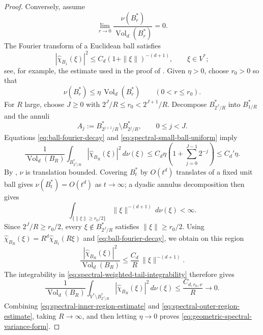 \documentclass[11pt,reqno,a4paper]{amsart}
\numberwithin{equation}{section}
\theoremstyle{compact}
\theoremstyle{definition}
\theoremstyle{definition}
\newcommand{\Vol}{\operatorname{Vol}}
\begin{document}
\begin{proof}
Conversely, assume
\begin{equation}\label{eq:spectral-smallness-fixed-coefficient}
  \lim_{r\to0}\frac{\nu(B_r^*)}{\Vol_d(B_r^*)}=0.
\end{equation}
The Fourier transform of a Euclidean ball satisfies
\begin{equation}\label{eq:ball-fourier-decay}
  |\widehat\chi_{B_1}(\xi)|^2
  \leq C_d(1+\|\xi\|)^{-(d+1)},
  \qquad \xi\in V^*;
\end{equation}
see, for example, the estimate used in the proof of
\cite[Theorem~3.6(iii)]{BH24}.  Given $\eta>0$, choose $r_0>0$ so that
\begin{equation}\label{eq:spectral-small-ball-uniform}
  \nu(B_r^*)\leq \eta\,\Vol_d(B_r^*)
  \qquad(0<r\leq r_0).
\end{equation}
For $R$ large, choose $J\geq0$ with
$2^J/R\leq r_0<2^{J+1}/R$.  Decompose $B_{2^J/R}^*$ into $B_{1/R}^*$ and
the annuli
\begin{equation}\label{eq:spectral-dyadic-annuli}
  A_j:=B_{2^{j+1}/R}^*\setminus B_{2^j/R}^*,
  \qquad 0\leq j<J.
\end{equation}
Equations \eqref{eq:ball-fourier-decay} and
\eqref{eq:spectral-small-ball-uniform} imply
\begin{equation}\label{eq:spectral-inner-region-estimate}
  \frac{1}{\Vol_d(B_R)}
  \int_{B_{2^J/R}^*}|\widehat\chi_{B_R}(\xi)|^2\,d\nu(\xi)
  \leq C_d\eta\left(1+\sum_{j=0}^{J-1}2^{-j}\right)
  \leq C_d'\eta.
\end{equation}
By , $\nu$ is translation bounded.
Covering $B_t^*$ by $O(t^d)$ translates of a fixed unit ball gives
$\nu(B_t^*)=O(t^d)$ as $t\to\infty$; a dyadic annulus decomposition then
gives
\begin{equation}\label{eq:spectral-weighted-tail-integrability}
  \int_{\{\|\xi\|\geq r_0/2\}}
       \|\xi\|^{-(d+1)}\,d\nu(\xi)<\infty.
\end{equation}
Since $2^J/R\geq r_0/2$, every
$\xi\notin B_{2^J/R}^*$ satisfies $\|\xi\|\geq r_0/2$.  Using
$\widehat\chi_{B_R}(\xi)=R^d\widehat\chi_{B_1}(R\xi)$ and
\eqref{eq:ball-fourier-decay}, we obtain on this region
\[
  \frac{|\widehat\chi_{B_R}(\xi)|^2}{\Vol_d(B_R)}
  \leq \frac{C_d}{R}\,\|\xi\|^{-(d+1)}.
\]
The integrability in \eqref{eq:spectral-weighted-tail-integrability} therefore
gives
\begin{equation}\label{eq:spectral-outer-region-estimate}
  \frac{1}{\Vol_d(B_R)}
  \int_{V^*\setminus B_{2^J/R}^*}
       |\widehat\chi_{B_R}(\xi)|^2\,d\nu(\xi)
  \leq \frac{C_{d,r_0,\nu}}{R}\longrightarrow0.
\end{equation}
Combining \eqref{eq:spectral-inner-region-estimate} and
\eqref{eq:spectral-outer-region-estimate}, taking $R\to\infty$, and then
letting $\eta\to0$ proves \eqref{eq:geometric-spectral-variance-form}.


\end{proof}
\end{document}
